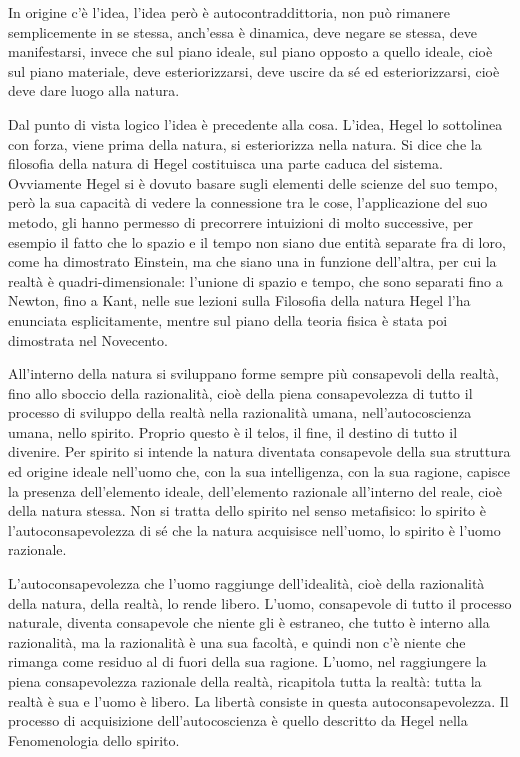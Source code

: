 \documentclass[a4paper,12pt,oneside,openany]{book}%
\begin{document}
In origine c’è l’idea, l’idea però è autocontraddittoria, non può rimanere semplicemente in se stessa, anch’essa è dinamica, deve negare se stessa, deve manifestarsi, invece che sul piano ideale, sul piano opposto a quello ideale, cioè sul piano materiale, deve esteriorizzarsi, deve uscire da sé ed esteriorizzarsi, cioè deve dare luogo alla natura.

Dal punto di vista logico l’idea è precedente alla cosa. L’idea, Hegel lo sottolinea con forza, viene prima della natura, si esteriorizza nella natura. Si dice che la filosofia della natura di Hegel costituisca una parte caduca del sistema. Ovviamente Hegel si è dovuto basare sugli elementi delle scienze del suo tempo, però la sua capacità di vedere la connessione tra le cose, l’applicazione del suo metodo, gli hanno permesso di precorrere intuizioni di molto successive, per esempio il fatto che lo spazio e il tempo non siano due entità separate fra di loro, come ha dimostrato Einstein, ma che siano una in funzione dell’altra, per cui la realtà è quadri-dimensionale: l’unione di spazio e tempo, che sono separati fino a Newton, fino a Kant, nelle sue lezioni sulla Filosofia della natura Hegel l’ha enunciata esplicitamente, mentre sul piano della teoria fisica è stata poi dimostrata nel Novecento.

All’interno della natura si sviluppano forme sempre più consapevoli della realtà, fino allo sboccio della razionalità, cioè della piena consapevolezza di tutto il processo di sviluppo della realtà nella razionalità umana, nell’autocoscienza umana, nello spirito. Proprio questo è il telos, il fine, il destino di tutto il divenire. Per spirito si intende la natura diventata consapevole della sua struttura ed origine ideale nell’uomo che, con la sua intelligenza, con la sua ragione, capisce la presenza dell’elemento ideale, dell’elemento razionale all’interno del reale, cioè della natura stessa. Non si tratta dello spirito nel senso metafisico: lo spirito è l’autoconsapevolezza di sé che la natura acquisisce nell’uomo, lo spirito è l’uomo razionale.

L’autoconsapevolezza che l’uomo raggiunge dell’idealità, cioè della razionalità della natura, della realtà, lo rende libero. L’uomo, consapevole di tutto il processo naturale, diventa consapevole che niente gli è estraneo, che tutto è interno alla razionalità, ma la razionalità è una sua facoltà, e quindi non c’è niente che rimanga come residuo al di fuori della sua ragione. L’uomo, nel raggiungere la piena consapevolezza razionale della realtà, ricapitola tutta la realtà: tutta la realtà è sua e l’uomo è libero. La libertà consiste in questa autoconsapevolezza. Il processo di acquisizione dell’autocoscienza è quello descritto da Hegel nella Fenomenologia dello spirito.
\end{document}
